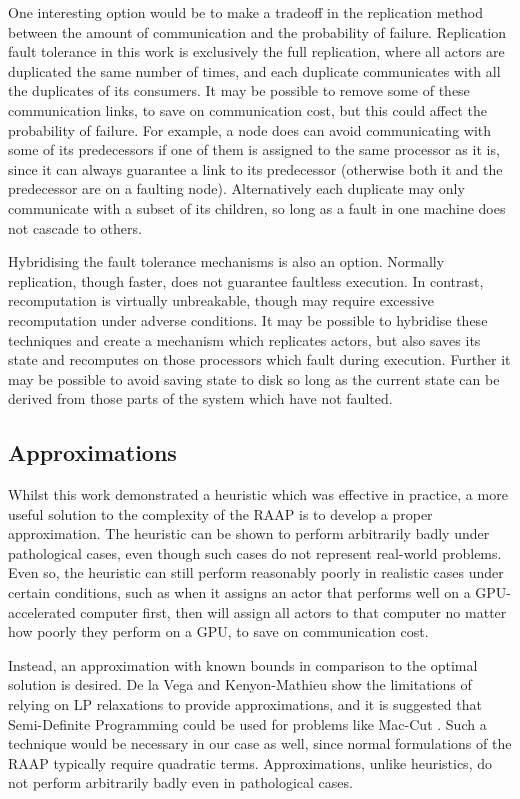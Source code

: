 One interesting option would be to make a tradeoff in the replication method between the amount of communication and the probability of failure.
Replication fault tolerance in this work is exclusively the full replication, where all actors are duplicated the same number of times, and each duplicate communicates with all the duplicates of its consumers.
It may be possible to remove some of these communication links, to save on communication cost, but this could affect the probability of failure.
For example, a node does can avoid communicating with some of its predecessors if one of them is assigned to the same processor as it is, since it can always guarantee a link to its predecessor (otherwise both it and the predecessor are on a faulting node).
Alternatively each duplicate may only communicate with a subset of its children, so long as a fault in one machine does not cascade to others.

Hybridising the fault tolerance mechanisms is also an option.
Normally replication, though faster, does not guarantee faultless execution.
In contrast, recomputation is virtually unbreakable, though may require excessive recomputation under adverse conditions.
It may be possible to hybridise these techniques and create a mechanism which replicates actors, but also saves its state and recomputes on those processors which fault during execution.
Further it may be possible to avoid saving state to disk so long as the current state can be derived from those parts of the system which have not faulted.

\subsection{Approximations}

Whilst this work demonstrated a heuristic which was effective in practice, a more useful solution to the complexity of the RAAP is to develop a proper approximation.
The heuristic can be shown to perform arbitrarily badly under pathological cases, even though such cases do not represent real-world problems.
Even so, the heuristic can still perform reasonably poorly in realistic cases under certain conditions, such as when it assigns an actor that performs well on a GPU-accelerated computer first, then will assign all actors to that computer no matter how poorly they perform on a GPU, to save on communication cost.

Instead, an approximation with known bounds in comparison to the optimal solution is desired.
De la Vega and Kenyon-Mathieu show the limitations of relying on LP relaxations to provide approximations, and it is suggested that Semi-Definite Programming could be used for problems like Mac-Cut \cite{fer07}.
Such a technique would be necessary in our case as well, since normal formulations of the RAAP typically require quadratic terms.
Approximations, unlike heuristics, do not perform arbitrarily badly even in pathological cases.

